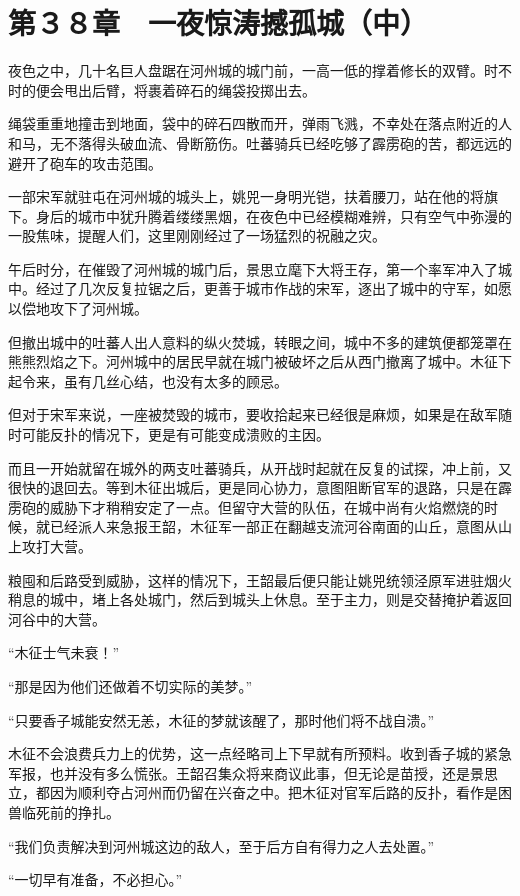 \section{第３８章　一夜惊涛撼孤城（中）}

夜色之中，几十名巨人盘踞在河州城的城门前，一高一低的撑着修长的双臂。时不时的便会甩出后臂，将裹着碎石的绳袋投掷出去。

绳袋重重地撞击到地面，袋中的碎石四散而开，弹雨飞溅，不幸处在落点附近的人和马，无不落得头破血流、骨断筋伤。吐蕃骑兵已经吃够了霹雳砲的苦，都远远的避开了砲车的攻击范围。

一部宋军就驻屯在河州城的城头上，姚兕一身明光铠，扶着腰刀，站在他的将旗下。身后的城市中犹升腾着缕缕黑烟，在夜色中已经模糊难辨，只有空气中弥漫的一股焦味，提醒人们，这里刚刚经过了一场猛烈的祝融之灾。

午后时分，在催毁了河州城的城门后，景思立麾下大将王存，第一个率军冲入了城中。经过了几次反复拉锯之后，更善于城市作战的宋军，逐出了城中的守军，如愿以偿地攻下了河州城。

但撤出城中的吐蕃人出人意料的纵火焚城，转眼之间，城中不多的建筑便都笼罩在熊熊烈焰之下。河州城中的居民早就在城门被破坏之后从西门撤离了城中。木征下起令来，虽有几丝心结，也没有太多的顾忌。

但对于宋军来说，一座被焚毁的城市，要收拾起来已经很是麻烦，如果是在敌军随时可能反扑的情况下，更是有可能变成溃败的主因。

而且一开始就留在城外的两支吐蕃骑兵，从开战时起就在反复的试探，冲上前，又很快的退回去。等到木征出城后，更是同心协力，意图阻断官军的退路，只是在霹雳砲的威胁下才稍稍安定了一点。但留守大营的队伍，在城中尚有火焰燃烧的时候，就已经派人来急报王韶，木征军一部正在翻越支流河谷南面的山丘，意图从山上攻打大营。

粮囤和后路受到威胁，这样的情况下，王韶最后便只能让姚兕统领泾原军进驻烟火稍息的城中，堵上各处城门，然后到城头上休息。至于主力，则是交替掩护着返回河谷中的大营。

“木征士气未衰！”

“那是因为他们还做着不切实际的美梦。”

“只要香子城能安然无恙，木征的梦就该醒了，那时他们将不战自溃。”

木征不会浪费兵力上的优势，这一点经略司上下早就有所预料。收到香子城的紧急军报，也并没有多么慌张。王韶召集众将来商议此事，但无论是苗授，还是景思立，都因为顺利夺占河州而仍留在兴奋之中。把木征对官军后路的反扑，看作是困兽临死前的挣扎。

“我们负责解决到河州城这边的敌人，至于后方自有得力之人去处置。”

“一切早有准备，不必担心。”

